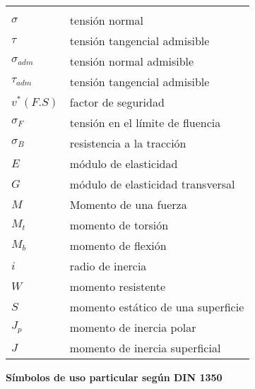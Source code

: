 \begin{mytable}[H]
	\centering
	\begin{tabular}{ll}
		\multicolumn{1}{c}{\quad\quad\quad} & \multicolumn{1}{c}{} \\
		$\sigma$\quad\quad\quad& tensión normal \\	
		$\tau$ & tensión tangencial admisible \\
		$\sigma_{adm}$ & tensión normal admisible \\
		$\tau_{adm}$ & tensión tangencial admisible \\
		$v^* (F.S)$ & factor de seguridad \\
		$\sigma_{F}$ & tensión en el límite de fluencia \\
		$\sigma_{B}$ & resistencia a la tracción \\
		$E$ & módulo de elasticidad \\
		$G$ & módulo de elasticidad transversal \\
		$M$ & Momento de una fuerza \\
		$M_{t}$ & momento de torsión \\
		$M_{b}$ & momento de flexión \\
		$i$ & radio de inercia \\
		$W$ & momento resistente \\
		$S$ & momento estático de una superficie \\
		$J_{p}$ & momento de inercia polar \\
		$J$ & momento de inercia superficial \\
	\end{tabular}
\end{mytable}

\newpage
\begin{center}
	\textbf{Símbolos de uso particular según DIN 1350}
\end{center}

